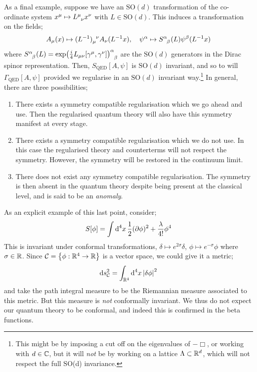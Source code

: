 \paraskip
As a final example, suppose we have an $\text{SO}(d)$ transformation of the co-ordinate system $x^{\mu}\mapsto L\indices{^{\mu}_{\nu}}x^{\nu}$ with $L \in \text{SO}(d)$. This induces a transformation on the fields;
\begin{equation*}
A_\mu(x) \mapsto (L^{-1})\indices{_{\mu}^{\nu}}A_\nu(L^{-1}x) , \quad \psi^\alpha \mapsto S\indices{^{\alpha}_{\beta}}(L)\psi^\beta(L^{-1}x)
\end{equation*}
where $S\indices{^{\alpha}_{\beta}}(L) = \exp(\tfrac{i}{4}L_{\mu\nu}[\gamma^\mu, \gamma^\nu])\indices{^{\alpha}_{\beta}}$ are the $\text{SO}(d)$ generators in the Dirac spinor representation. Then, $S_{\text{QED}}[A, \psi]$ is $\text{SO}(d)$ invariant, and so to will $\Gamma_{\text{QED}}[A, \psi]$ provided we regularise in an $\text{SO}(d)$ invariant way.\footnote{This might be by imposing a cut off on the eigenvalues of $-\Box$, or working with $d \in \mathbb{C}$, but it will \emph{not} be by working on a lattice $\Lambda \subset \mathbb{R}^{d}$, which will not respect the full $\text{SO}$(d) invariance.} In general, there are three possibilities;
\begin{enumerate}
\item There exists a symmetry compatible regularisation which we go ahead and use. Then the regularised quantum theory will also have this symmetry manifest at every stage.
\item There exists a symmetry compatible regularisation which we do not use. In this case the regularised theory and counterterms will not respect the symmetry. However, the symmetry will be restored in the continuum limit.
\item There does not exist any symmetry compatible regularisation. The symmetry is then absent in the quantum theory despite being present at the classical level, and is said to be an \emph{anomaly}. 
\end{enumerate}
As an explicit example of this last point, consider;
\begin{equation*}
S[\phi] = \int{\text{d}^4 x \,\frac{1}{2}(\partial\phi)^2 + \frac{\lambda}{4!}\phi^4}
\end{equation*}
This is invariant under conformal transformations, $\delta \mapsto e^{2\sigma}\delta$, $\phi \mapsto e^{-\sigma}\phi$ where $\sigma \in \mathbb{R}$. Since $\mC = \set{\phi : \RR^4 \rightarrow \RR}$ is a vector space, we could give it a metric;
\begin{equation*}
\ud s^2_{\mC} = \int_{\RR^4}{\upd{^4 x}\abs{\delta \phi}^2}
\end{equation*}
and take the path integral measure to be the Riemannian measure associated to this metric. But this measure is \emph{not} conformally invariant. We thus do not expect our quantum theory to be conformal, and indeed this is confirmed in the beta functions.
